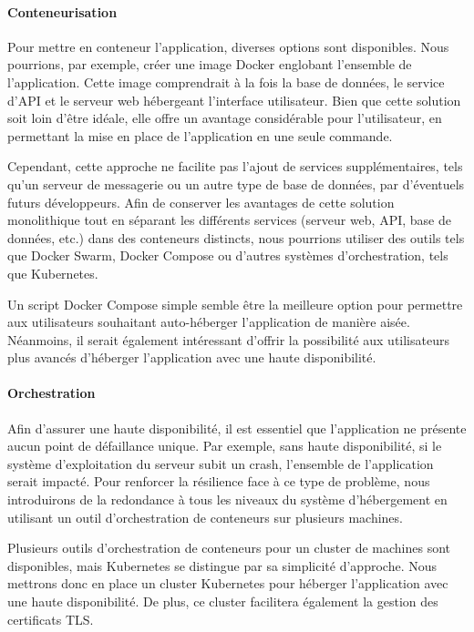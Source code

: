 \paragraph{Conteneurisation}
Pour mettre en conteneur l'application, diverses options sont disponibles.
Nous pourrions, par exemple, créer une image Docker englobant l'ensemble de l'application.
Cette image comprendrait à la fois la base de données, le service d'API et le serveur web hébergeant l'interface utilisateur.
Bien que cette solution soit loin d'être idéale, elle offre un avantage considérable pour l'utilisateur, en permettant la mise en place de l'application en une seule commande.

Cependant, cette approche ne facilite pas l'ajout de services supplémentaires, tels qu'un serveur de messagerie ou un autre type de base de données, par d'éventuels futurs développeurs.
Afin de conserver les avantages de cette solution monolithique tout en séparant les différents services (serveur web, API, base de données, etc.) dans des conteneurs distincts, nous pourrions utiliser des outils tels que Docker Swarm, Docker Compose ou d'autres systèmes d'orchestration, tels que Kubernetes.

Un script Docker Compose simple semble être la meilleure option pour permettre aux utilisateurs souhaitant auto-héberger l'application de manière aisée.
Néanmoins, il serait également intéressant d'offrir la possibilité aux utilisateurs plus avancés d'héberger l'application avec une haute disponibilité.

\paragraph{Orchestration}
Afin d'assurer une haute disponibilité, il est essentiel que l'application ne présente aucun point de défaillance unique.
Par exemple, sans haute disponibilité, si le système d'exploitation du serveur subit un crash, l'ensemble de l'application serait impacté.
Pour renforcer la résilience face à ce type de problème,
nous introduirons de la redondance à tous les niveaux du système d'hébergement en utilisant un outil d'orchestration de conteneurs sur plusieurs machines.

Plusieurs outils d'orchestration de conteneurs pour un cluster de machines sont disponibles, mais Kubernetes se distingue par sa simplicité d'approche.
Nous mettrons donc en place un cluster Kubernetes pour héberger l'application avec une haute disponibilité.
De plus, ce cluster facilitera également la gestion des certificats TLS\@.

